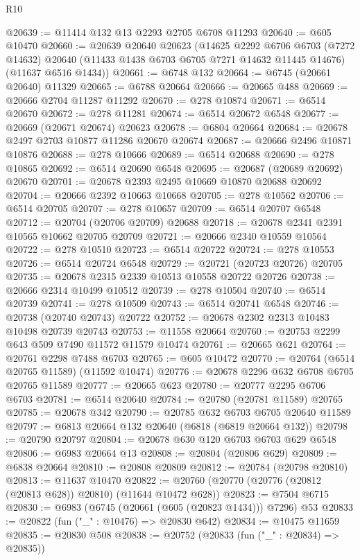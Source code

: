 \begin{lexlean}{R10}
\begin{coremodule}
@20639 := @11414 @132 @13 @2293 @2705 @6708 @11293
@20640 := @605 @10470
@20660 := @20639
    @20640
    @20623
    (@14625
      @2292
      @6706
      @6703
      (@7272 @14632)
      @20640
      (@11433 @1438 @6703 @6705 @7271 @14632 @11445 @14676)
      (@11637 @6516 @1434))
@20661 := @6748 @132
@20664 := @6745 (@20661 @20640) @11329
@20665 := @6788 @20664
@20666 := @20665 @488
@20669 := @20666 @2704 @11287 @11292
@20670 := @278 @10874
@20671 := @6514 @20670
@20672 := @278 @11281
@20674 := @6514 @20672 @6548
@20677 := @20669 (@20671 @20674) @20623
@20678 := @6804 @20664
@20684 := @20678 @2497 @2703 @10877 @11286 @20670 @20674
@20687 := @20666 @2496 @10871 @10876
@20688 := @278 @10666
@20689 := @6514 @20688
@20690 := @278 @10865
@20692 := @6514 @20690 @6548
@20695 := @20687 (@20689 @20692) @20670
@20701 := @20678 @2393 @2495 @10669 @10870 @20688 @20692
@20704 := @20666 @2392 @10663 @10668
@20705 := @278 @10562
@20706 := @6514 @20705
@20707 := @278 @10657
@20709 := @6514 @20707 @6548
@20712 := @20704 (@20706 @20709) @20688
@20718 := @20678 @2341 @2391 @10565 @10662 @20705 @20709
@20721 := @20666 @2340 @10559 @10564
@20722 := @278 @10510
@20723 := @6514 @20722
@20724 := @278 @10553
@20726 := @6514 @20724 @6548
@20729 := @20721 (@20723 @20726) @20705
@20735 := @20678 @2315 @2339 @10513 @10558 @20722 @20726
@20738 := @20666 @2314 @10499 @10512
@20739 := @278 @10504
@20740 := @6514 @20739
@20741 := @278 @10509
@20743 := @6514 @20741 @6548
@20746 := @20738 (@20740 @20743) @20722
@20752 := @20678 @2302 @2313 @10483 @10498 @20739 @20743
@20753 := @11558 @20664
@20760 := @20753 @2299 @643 @509 @7490 @11572 @11579 @10474
@20761 := @20665 @621
@20764 := @20761 @2298 @7488 @6703
@20765 := @605 @10472
@20770 := @20764 (@6514 @20765 @11589) (@11592 @10474)
@20776 := @20678 @2296 @632 @6708 @6705 @20765 @11589
@20777 := @20665 @623
@20780 := @20777 @2295 @6706 @6703
@20781 := @6514 @20640
@20784 := @20780 (@20781 @11589) @20765
@20785 := @20678 @342
@20790 := @20785 @632 @6703 @6705 @20640 @11589
@20797 := @6813 @20664 @132 @20640 (@6818 (@6819 @20664 @132))
@20798 := @20790 @20797
@20804 := @20678 @630 @120 @6703 @6703 @629 @6548
@20806 := @6983 @20664 @13
@20808 := @20804 (@20806 @629)
@20809 := @6838 @20664
@20810 := @20808 @20809
@20812 := @20784 (@20798 @20810)
@20813 := @11637 @10470
@20822 := @20760 (@20770 (@20776 (@20812 (@20813 @628)) @20810) (@11644 @10472 @628))
@20823 := @7504 @6715
@20830 := @6983 (@6745 (@20661 (@605 (@20823 @1434))) @7296) @53
@20833 := @20822 (fun ("_" : @10476) => @20830 @642)
@20834 := @10475 @11659
@20835 := @20830 @508
@20838 := @20752 (@20833 (fun ("_" : @20834) => @20835))

\end{coremodule}
\end{lexlean}
